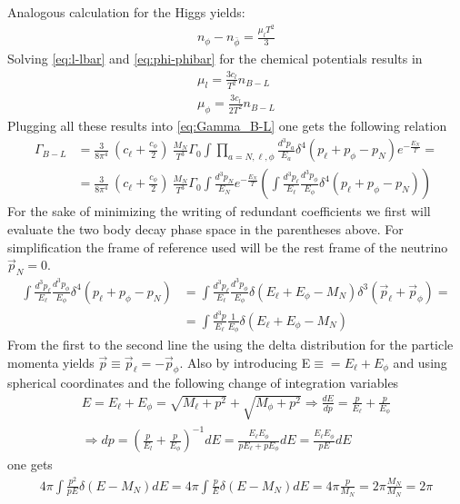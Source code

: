 Analogous calculation for the Higgs yields:
\begin{align*}
	n_\phi-n_{\bar{\phi}}=\frac{\mu_lT^2}{3}
\end{align*}
Solving \ref{eq:l-lbar} and \ref{eq:phi-phibar} for the chemical potentials results in
\begin{align*}
	\mu_l=\frac{3c_l}{T^2}n_{B-L}\\
	\mu_\phi=\frac{3c_l}{2T^2}n_{B-L}
\end{align*}
Plugging all these results into \ref{eq:Gamma_B-L} one gets the following relation
\begin{align*}
	\Gamma_{B-L}&=\frac{3}{8\pi^4}\:\left(c_\ell+\frac{c_\phi}{2}\right)\:\frac{M_N}{T^3}\Gamma_0\int\prod_{a=N,\ell,\phi}\frac{d^3p_a}{E_a}\delta^4\left(p_\ell+p_\phi-p_N\right)e^{-\frac{E_N}{T}}=\\
	&=\frac{3}{8\pi^4}\:\left(c_\ell+\frac{c_\phi}{2}\right)\:\frac{M_N}{T^3}\Gamma_0\int \frac{d^3p_N}{E_N}e^{-\frac{E_N}{T}}\left(\int\frac{d^3p_\ell}{E_\ell}\frac{d^3p_\phi}{E_\phi}\delta^4\left(p_\ell+p_\phi-p_N\right)\right)
\end{align*}
For the sake of minimizing the writing of redundant coefficients we first will evaluate the two body decay phase space in the parentheses above. For simplification the frame of reference used will be the rest frame of the neutrino $\vec{p}_N=0$.
\begin{align*}
\int\frac{d^3p_\ell}{E_\ell}\frac{d^3p_\phi}{E_\phi}\delta^4\left(p_\ell+p_\phi-p_N\right)&=\int\frac{d^3p_\ell}{E_\ell}\frac{d^3p_\phi}{E_\phi}\delta\left(E_\ell+E_\phi-M_N\right)\delta^3\left(\vec{p}_\ell+\vec{p}_\phi\right)=\\
&=\int\frac{d^3p}{E_\ell}\frac{1}{E_\phi}\delta\left(E_\ell+E_\phi-M_N\right)
\end{align*}
From the first to the second line the using the delta distribution for the particle momenta yields $\vec{p}\equiv\vec{p}_\ell=-\vec{p}_\phi$. Also by introducing E$\equiv=E_\ell+E_\phi$ and using spherical coordinates and the following change of integration variables
\begin{align*}
	E=E_\ell+E_\phi=\sqrt{M_\ell+p^2}+\sqrt{M_\phi+p^2} \Longrightarrow \frac{dE}{dp}=\frac{p}{E_\ell}+\frac{p}{E_\phi} \\
	\Longrightarrow dp=\left(\frac{p}{E_l}+\frac{p}{E_\phi}\right)^{-1}dE=\frac{E_\ell E_\phi}{pE_\ell+pE_\phi}dE=\frac{E_\ell E_\phi}{pE}dE
\end{align*}
one gets
\begin{align*}
	4\pi\int \frac{p^2}{pE}\delta\left(E-M_N\right)dE=4\pi\int \frac{p}{E}\delta\left(E-M_N\right)dE=4\pi\frac{p}{M_N}=2\pi \frac{M_N}{M_N}=2\pi
\end{align*}
